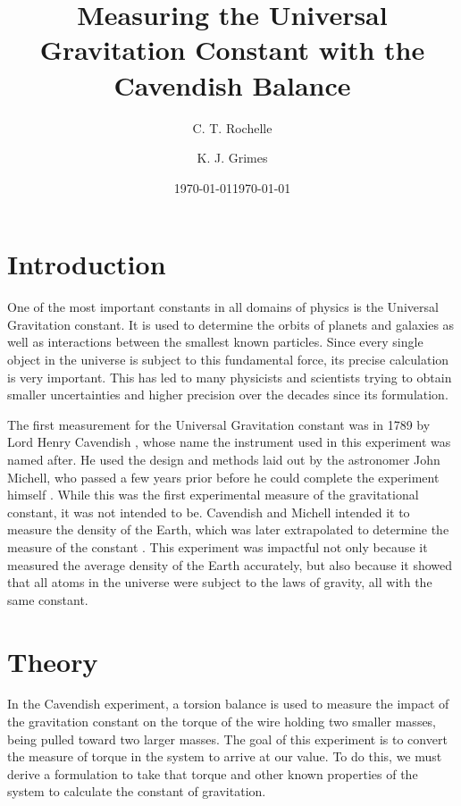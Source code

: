 \documentclass[aps,prl,10pt,twocolumn,floatfix]{revtex4-2}
\begin{document}


\title{Measuring the Universal Gravitation Constant with the Cavendish Balance}
\author{C. T. Rochelle}
\author{K. J. Grimes}
\date{\today}
\date{\today}

\maketitle

\section{Introduction}\label{Intro}
One of the most important constants in all domains of physics is the Universal Gravitation constant. 
It is used to determine the orbits of planets and galaxies as well as interactions between the smallest known particles.
Since every single object in the universe is subject to this fundamental force, its precise calculation is very important.
This has led to many physicists and scientists trying to obtain smaller uncertainties and higher precision over the decades since its formulation. 

The first measurement for the Universal Gravitation constant was in 1789 by Lord Henry Cavendish \cite{class}, whose name the instrument used in this experiment was named after. 
He used the design and methods laid out by the astronomer John Michell, who passed a few years prior before he could complete the experiment himself \cite{birtanica}. 
While this was the first experimental measure of the gravitational constant, it was not intended to be. 
Cavendish and Michell intended it to measure the density of the Earth, which was later extrapolated to determine the measure of the constant \cite{britanica}.
This experiment was impactful not only because it measured the average density of the Earth accurately, but also because it showed that all atoms in the universe were subject to the laws of gravity, all with the same constant. 


\section{Theory}\label{Theory}
In the Cavendish experiment, a torsion balance is used to measure the impact of the gravitation constant on the torque of the wire holding two smaller masses, being pulled toward two larger masses. 
The goal of this experiment is to convert the measure of torque in the system to arrive at our value. 
To do this, we must derive a formulation to take that torque and other known properties of the system to calculate the constant of gravitation. 
\end{document}
